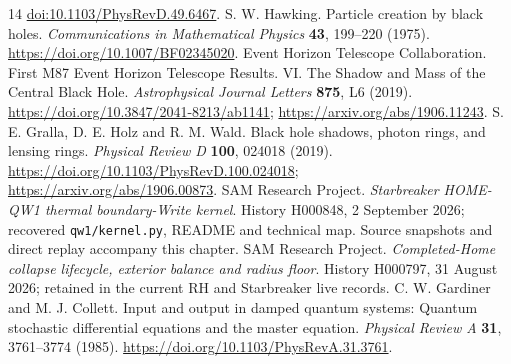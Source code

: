 \documentclass[10pt,twocolumn,letterpaper]{article}
\begin{document}
\begin{thebibliography}{14}
\href{https://doi.org/10.1103/PhysRevD.49.6467}{doi:10.1103/PhysRevD.49.6467}.
 S. W. Hawking. Particle creation by black holes.
\emph{Communications in Mathematical Physics} \textbf{43},
199--220 (1975). \url{https://doi.org/10.1007/BF02345020}.
 Event Horizon Telescope Collaboration. First M87 Event
Horizon Telescope Results. VI. The Shadow and Mass of the Central
Black Hole. \emph{Astrophysical Journal Letters} \textbf{875}, L6
(2019). \url{https://doi.org/10.3847/2041-8213/ab1141};
\url{https://arxiv.org/abs/1906.11243}.
 S. E. Gralla, D. E. Holz and R. M. Wald. Black hole
shadows, photon rings, and lensing rings. \emph{Physical Review D}
\textbf{100}, 024018 (2019).
\url{https://doi.org/10.1103/PhysRevD.100.024018};
\url{https://arxiv.org/abs/1906.00873}.
 SAM Research Project. \emph{Starbreaker HOME-QW1 thermal boundary-Write kernel}. History H000848, 2 September 2026; recovered \texttt{qw1/kernel.py}, README and technical map. Source snapshots and direct replay accompany this chapter.
 SAM Research Project. \emph{Completed-Home collapse lifecycle, exterior balance and radius floor}. History H000797, 31 August 2026; retained in the current RH and Starbreaker live records.
 C. W. Gardiner and M. J. Collett. Input and output in damped quantum systems: Quantum stochastic differential equations and the master equation. \emph{Physical Review A} \textbf{31}, 3761--3774 (1985). \url{https://doi.org/10.1103/PhysRevA.31.3761}.
\end{thebibliography}
\end{document}
